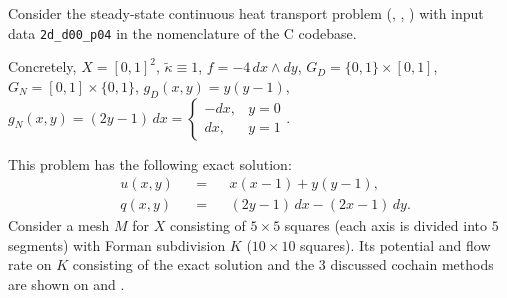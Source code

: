 \begin{example}
  \label{cmc/diffusion/continuous/steady_state/examples/2d_d00_p04-example}
  Consider the steady-state continuous heat transport problem
  (,
   ,
   )
  with input data \verb|2d_d00_p04| in the nomenclature of the C codebase.

  Concretely,
    $X = [0, 1]^2$,
    $\tilde{\kappa} \equiv 1$,
    $f = - 4 \, d x \wedge d y$,
    $G_D = \{0, 1\} \times [0, 1]$,
    $G_N = [0, 1] \times \{0, 1\}$,
    $g_D(x, y) = y (y - 1)$,
    $g_N(x, y) = (2 y - 1) \, d x =
      \begin{cases}
        - d x, & y = 0 \\
          d x, & y = 1
      \end{cases}
    $.

  This problem has the following exact solution:
  \begin{subequations}
    \begin{alignat}{3}
      & u(x, y) && = && x (x - 1) + y (y - 1), \\
      & q(x, y) && = && (2 y - 1)\, d x - (2 x - 1)\, d y.
    \end{alignat}
  \end{subequations}
  Consider a mesh $M$ for $X$ consisting of $5 \times 5$ squares (each axis is
  divided into $5$ segments) with Forman subdivision $K$
  ($10 \times 10$ squares).
  Its potential and flow rate on $K$ consisting of the exact solution and the
  $3$ discussed cochain methods are shown on
  and
  .
\end{example}
